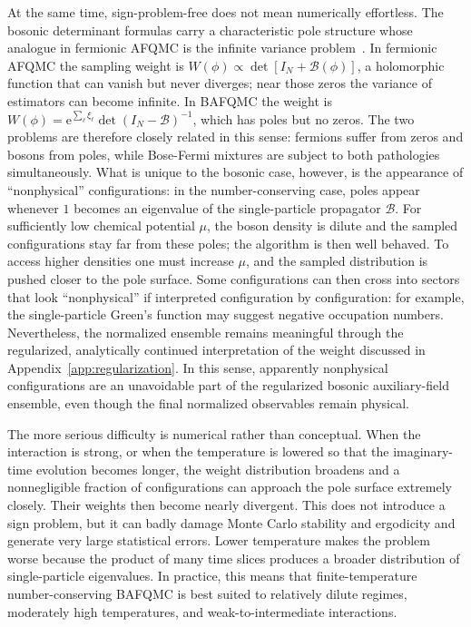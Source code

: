\documentclass[twocolumn,aps,prb,10pt,amsmath,amssymb,amsthm,superscriptaddress]{revtex4-2}
\newcommand{\ee}{\mathrm{e}}
\newcommand{\mc}[1]{\mathcal{#1}}
\theoremstyle{remark}
\begin{document}
At the same time, sign-problem-free does not mean numerically effortless. The bosonic determinant formulas carry a characteristic pole structure whose analogue in fermionic AFQMC is the infinite variance problem~\cite{alexandru2023prd,wan2025infinite}. In fermionic AFQMC the sampling weight is $W(\phi)\propto\det[I_N+\mc B(\phi)]$, a holomorphic function that can vanish but never diverges; near those zeros the variance of estimators can become infinite. In BAFQMC the weight is $W(\phi)=\ee^{\sum_\ell \xi_\ell}\det(I_N-\mc B)^{-1}$, which has poles but no zeros. The two problems are therefore closely related in this sense: fermions suffer from zeros and bosons from poles, while Bose-Fermi mixtures are subject to both pathologies simultaneously. What is unique to the bosonic case, however, is the appearance of ``nonphysical'' configurations: in the number-conserving case, poles appear whenever $1$ becomes an eigenvalue of the single-particle propagator $\mc B$. For sufficiently low chemical potential $\mu$, the boson density is dilute and the sampled configurations stay far from these poles; the algorithm is then well behaved. To access higher densities one must increase $\mu$, and the sampled distribution is pushed closer to the pole surface. Some configurations can then cross into sectors that look ``nonphysical'' if interpreted configuration by configuration: for example, the single-particle Green's function may suggest negative occupation numbers. Nevertheless, the normalized ensemble remains meaningful through the regularized, analytically continued interpretation of the weight discussed in Appendix~\ref{app:regularization}. In this sense, apparently nonphysical configurations are an unavoidable part of the regularized bosonic auxiliary-field ensemble, even though the final normalized observables remain physical.

The more serious difficulty is numerical rather than conceptual. When the interaction is strong, or when the temperature is lowered so that the imaginary-time evolution becomes longer, the weight distribution broadens and a nonnegligible fraction of configurations can approach the pole surface extremely closely. Their weights then become nearly divergent. This does not introduce a sign problem, but it can badly damage Monte Carlo stability and ergodicity and generate very large statistical errors. Lower temperature makes the problem worse because the product of many time slices produces a broader distribution of single-particle eigenvalues. In practice, this means that finite-temperature number-conserving BAFQMC is best suited to relatively dilute regimes, moderately high temperatures, and weak-to-intermediate interactions.
\end{document}
